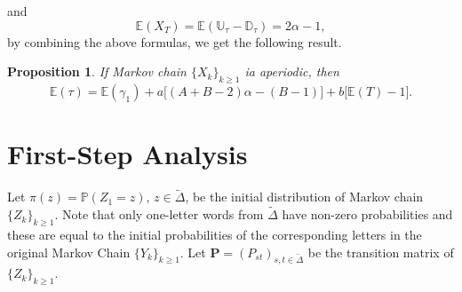 \documentclass{amsart}
\newtheorem{Proposition}{Proposition}
\newcommand{\PP}{{\mathbb{P}}}
\newcommand{\EE}{{\mathbb{E}}}
\newcommand{\U}{{\mathbb{U}}}
\newcommand{\D}{{\mathbb{D}}}
\newcommand{\1}{{\mathbf{1}}}
\begin{document}
and
$$\EE(X_{T}) =\EE(\U_\tau-\D_\tau)= 2\alpha-1,$$
by combining the above formulas, we get the following result. {
\begin{Proposition}
If Markov chain  $\{X_k\}_{k\geq 1}$ ia aperiodic, then
\begin{equation}\label{tau*via*T}
  \EE(\tau)
  =
  \EE(\gamma_1) + a\big[(A + B-2)\alpha - (B-1)\big]
  + b\big[\EE(T) - 1\big].
\end{equation}
\end{Proposition}}

\section{First-Step Analysis}\label{standard*caculations}

Let $\pi(z)=\PP(Z_1=z)$, $z \in \tilde{\Delta}$, be the initial distribution of Markov chain $\{Z_k\}_{k\geq 1}$.
Note that only one-letter words from $\tilde{\Delta}$ have non-zero probabilities and these are equal to the
initial probabilities of the corresponding letters in the original Markov Chain $\{Y_k\}_{k\geq 1}$.
Let $\mathbf{P}=(P_{st})_{s,t\in\tilde{\Delta}}$ be the transition matrix of $\{Z_k\}_{k\geq 1}$.
\end{document}
